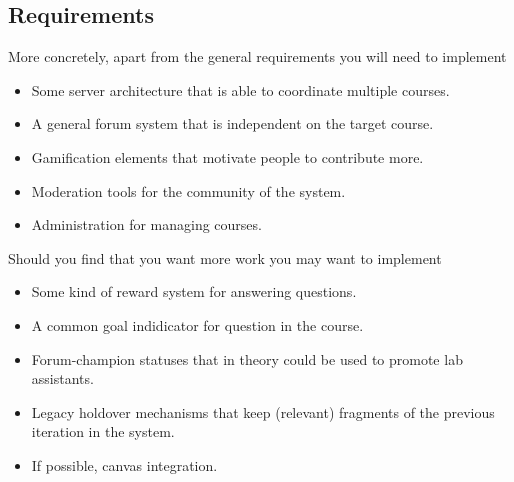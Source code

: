 \begin{refsection}
\subsection*{Requirements}
More concretely, apart from the general requirements you will need to implement
\begin{itemize}
    \item Some server architecture that is able to coordinate multiple courses.
    \item A general forum system that is independent on the target course.
    \item Gamification elements that motivate people to contribute more.
    \item Moderation tools for the community of the system.
    \item Administration for managing courses.
\end{itemize}
Should you find that you want more work you may want to implement
\begin{itemize}
    \item Some kind of reward system for answering questions.
    \item A common goal indidicator for question in the course.
    \item Forum-champion statuses that in theory could be used to promote lab assistants.
    \item Legacy holdover mechanisms that keep (relevant) fragments of the previous iteration in the system.
    \item If possible, canvas integration.
\end{itemize}

\end{refsection}
